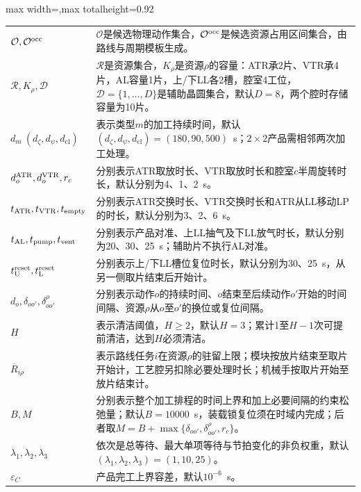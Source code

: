 \begin{table}[!htbp]
\begin{adjustbox}{max width=\linewidth,max totalheight=0.92\textheight}
\begin{tabular}{@{}>{\raggedright\arraybackslash}p{}p{}@{}}
$\mathcal O,\mathcal O^{\rm occ}$ & $\mathcal O$是候选物理动作集合，$\mathcal O^{\rm occ}$是候选资源占用区间集合，由路线与周期模板生成。\\
$\mathcal R,K_\rho,\mathcal D$ & $\mathcal R$是资源集合，$K_\rho$是资源$\rho$的容量：ATR承2片、VTR承4片，AL容量1片，上/下LL各2槽，腔室4工位，$\mathcal D=\{1,\ldots,D\}$是辅助晶圆集合，默认$D=8$，两个腔时存储容量为10片。\\
$d_m\ (d_\zeta,d_\psi,d_{\mathrm{cl}})$ & 表示类型$m$的加工持续时间，默认$(d_\zeta,d_\psi,d_{\mathrm{cl}})=(180,90,500)$~s；$2\times2$产品需相邻两次加工处理。\\
$d_o^{\rm ATR},d_o^{\rm VTR},r_c$ & 分别表示ATR取放时长、VTR取放时长和腔室$c$半周旋转时长，默认分别为4、1、2~s。\\
$t_{\rm ATR},t_{\rm VTR},t_{\rm empty}$ & 分别表示ATR交换时长、VTR交换时长和ATR从LL移动LP的时长，默认分别为3、2、6~s。\\
$t_{\rm AL},t_{\rm pump},t_{\rm vent}$ & 分别表示产品对准、上LL抽气及下LL放气时长，默认分别为20、30、25~s；辅助片不执行AL对准。\\
$t_{\rm U}^{\rm reset},t_{\rm L}^{\rm reset}$ & 分别表示上/下LL槽位复位时长，默认分别为30、25~s，从另一侧取片结束后开始计。\\
$d_o,\delta_{oo'},\delta^\rho_{oo'}$ & 分别表示动作$o$的持续时间、$o$结束至后续动作$o'$开始的时间间隔、资源$\rho$从$o$至$o'$的换位或复位间隔。\\
$H$ & 表示清洁阈值，$H\ge2$，默认$H=3$；累计1至$H-1$次可提前清洁，达到$H$必须清洁。\\
$\overline R_{i\rho}$ & 表示路线任务$i$在资源$\rho$的驻留上限；模块按放片结束至取片开始计，工艺腔另扣除必要处理时长；机械手按取片开始至放片结束计。\\
$B,M$ & 分别表示整个加工排程的时间上界和加上必要间隔的约束松弛量；默认$B=10000$~s，装载锁复位须在时域内完成；后者取$M=B+\max\{\delta_{oo'},\delta^\rho_{oo'},r_c\}$。\\
$\lambda_1,\lambda_2,\lambda_3$ & 依次是总等待、最大单项等待与节拍变化的非负权重，默认$(\lambda_1,\lambda_2,\lambda_3)=(1,10,25)$。\\
$\varepsilon_C$ & 产品完工上界容差，默认$10^{-6}$~s。\\
\bottomrule
\end{tabular}
\end{adjustbox}
\end{table}

